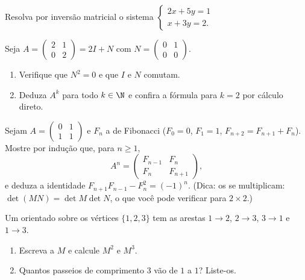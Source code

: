 \begin{exercise}[$\star$]\label{exo:g12:matrix:3}
Resolva por inversão matricial o sistema
$\begin{cases} 2x + 5y = 1\\ x + 3y = 2 . \end{cases}$
\end{exercise}

\begin{exercise}[$\star\star$]\label{exo:g12:matrix:4}
Seja $A = \begin{pmatrix} 2 & 1\\ 0 & 2\end{pmatrix} = 2I + N$ com
$N = \begin{pmatrix} 0 & 1\\ 0 & 0 \end{pmatrix}$.
\begin{enumerate}
  \item Verifique que $N^2 = 0$ e que $I$ e $N$ comutam.
  \item Deduza $A^k$ para todo $k \in \N$ e confira a fórmula para $k=2$
        por cálculo direto.
\end{enumerate}
\end{exercise}

\begin{exercise}[$\star\star$]\label{exo:g12:matrix:5}
Sejam $A = \begin{pmatrix} 0 & 1\\ 1 & 1\end{pmatrix}$ e $F_n$ a 
de Fibonacci ($F_0 = 0$, $F_1 = 1$, $F_{n+2} = F_{n+1} + F_n$). Mostre por
indução que, para $n \geq 1$,
\[
A^n = \begin{pmatrix} F_{n-1} & F_n\\ F_n & F_{n+1}\end{pmatrix},
\]
e deduza a identidade $F_{n+1}F_{n-1} - F_n^2 = (-1)^n$.
(Dica: os  se multiplicam: $\det(MN) = \det M \det N$, o que
você pode verificar para  $2\times2$.)
\end{exercise}

\begin{exercise}[$\star\star$]\label{exo:g12:matrix:6}
Um  orientado sobre os vértices $\{1, 2, 3\}$ tem as arestas
$1\to2$, $2\to3$, $3\to1$ e $1\to3$.
\begin{enumerate}
  \item Escreva a  $M$ e calcule $M^2$ e $M^3$.
  \item Quantos passeios de comprimento $3$ vão de $1$ a $1$? Liste-os.
\end{enumerate}
\end{exercise}

